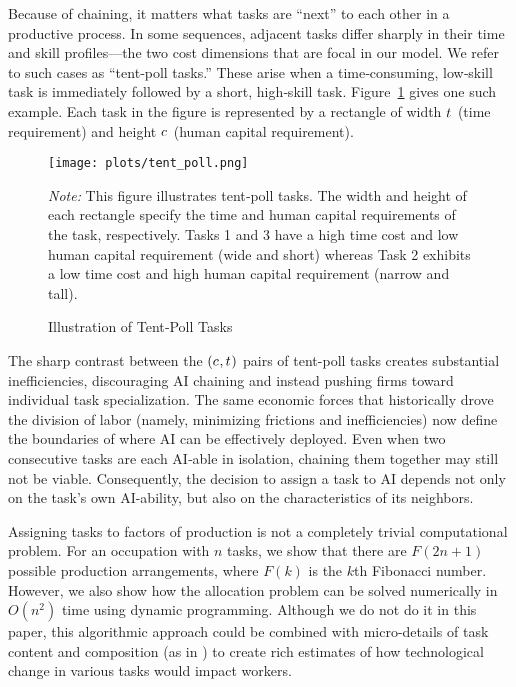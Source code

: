 \documentclass{article}
\theoremstyle{plain}
\theoremstyle{plain}
\begin{document}
Because of chaining, it matters what tasks are ``next'' to each other in a productive process.
In some sequences, adjacent tasks differ sharply in their time and skill profiles---the two cost dimensions that are focal in our model.
We refer to such cases as ``tent‐poll tasks.''
These arise when a time‐consuming, low‐skill task is immediately followed by a short, high‐skill task.
Figure~\ref{fig:tent_poll} gives one such example.
Each task in the figure is represented by a rectangle of width $t_{}$ (time requirement) and height $c_{}$ (human capital requirement).
\begin{figure}[h!]
  \caption{Illustration of Tent‐Poll Tasks} 
  \label{fig:tent_poll}
  \begin{center}
    \texttt{[image: plots/tent\_poll.png]}
  \end{center}
  \begin{footnotesize}
    \emph{Note:} This figure illustrates tent‐poll tasks.  
    The width and height of each rectangle specify the time and human capital requirements of the task, respectively.
    Tasks 1 and 3 have a high time cost and low human capital requirement (wide and short) whereas Task 2 exhibits a low time cost and high human capital requirement (narrow and tall).  
  \end{footnotesize}
\end{figure}
The sharp contrast between the $(c_{}, t_{})$ pairs of tent-poll tasks creates substantial inefficiencies, discouraging AI chaining and instead pushing firms toward individual task specialization.
The same economic forces that historically drove the division of labor (namely, minimizing frictions and inefficiencies) now define the boundaries of where AI can be effectively deployed.
Even when two consecutive tasks are each AI‐able in isolation, chaining them together may still not be viable.
Consequently, the decision to assign a task to AI depends not only on the task's own AI-ability, but also on the characteristics of its neighbors.

Assigning tasks to factors of production is not a completely trivial computational problem.
For an occupation with $n$ tasks, we show that there are $F(2n + 1)$ possible production arrangements, where $F(k)$ is the $k$th Fibonacci number.
However, we also show how the allocation problem can be solved numerically in $O(n^2)$ time using dynamic programming.
Although we do not do it in this paper, this algorithmic approach could be combined with micro-details of task content and composition (as in \cite{frey2017future, felten2021occupational, eloundou2023gpts}) to create rich estimates of how technological change in various tasks would impact workers.
\end{document}
